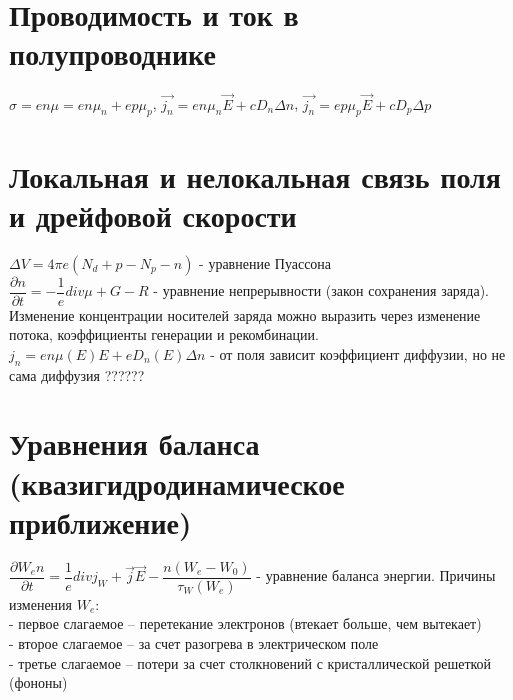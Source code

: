 \begin{multicols*}{2}
		\section{Проводимость и ток в полупроводнике}
		$\sigma = en\mu = en\mu_n + ep\mu_p$, \quad $\vec{j_n} = en\mu_n\vec{E} + cD_n\Delta n$, \quad $\vec{j_n} = ep\mu_p\vec{E} + cD_p\Delta p$
		
		\section{Локальная и нелокальная связь поля и дрейфовой скорости}
		$\Delta V = 4 \pi e (N_d + p - N_p - n)$ - уравнение Пуассона\\
		$\dfrac{\partial n}{\partial t} = - \dfrac{1}{e} div \mu + G - R$ - уравнение непрерывности (закон сохранения заряда). Изменение концентрации носителей заряда можно выразить через изменение потока, коэффициенты генерации и рекомбинации.\\
		$j_n = en \mu(E) E + e D_n(E) \Delta n$ - от поля зависит коэффициент диффузии, но не сама диффузия ??????

		\section{Уравнения баланса (квазигидродинамическое приближение)}
		$\dfrac{\partial W_e n}{\partial t} = \dfrac{1}{e} div j_W + \vec{j}\vec{E} - \dfrac{n(W_e - W_0)}{\tau_W(W_e)}$ - уравнение баланса энергии. Причины изменения $W_e$:\\
		- первое слагаемое – перетекание электронов (втекает больше, чем вытекает)\\
		- второе слагаемое – за счет разогрева в электрическом поле\\
		- третье слагаемое – потери за счет столкновений с кристаллической решеткой (фононы)\\


\end{multicols*}
